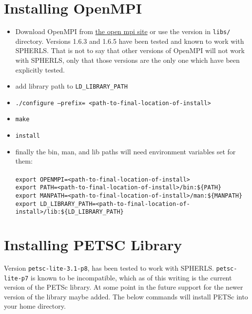 \documentclass[12pt,a4paper]{book}
\begin{document}
\section{Installing OpenMPI}
\begin{itemize}
\item Download OpenMPI from \href{http://www.open-mpi.org/software/ompi/v1.6/}{the open mpi site} or use the version in {\tt libs/} directory. Versions 1.6.3 and 1.6.5 have been tested and known to work with SPHERLS. That is not to say that other versions of OpenMPI will not work with SPHERLS, only that those versions are the only one which have been explicitly tested.

\item add library path to {\tt LD\_LIBRARY\_PATH}
\item {\tt ./configure --prefix=\- <path-to-final-location-of-install>}
\item {\tt make}
\item {\tt install}
\item finally the bin, man, and lib paths will need environment variables set for them:\\
 \\

{\tt export OPENMPI\-=<path-to-final-location-of-install>}\\
{\tt export PATH\-=<path-to-final-location-of-install>/bin:\-\$\{PATH\}}\\
{\tt export MANPATH\-=<path-to-final-location-of-install>/man:\-\$\{MANPATH\}}\\
{\tt export LD\_LIBRARY\_PATH\-=<path-to-final-location-of-install>/lib\-:\$\{LD\_LIBRARY\_PATH\}}\\

\end{itemize}

\section{Installing PETSC Library}
Version {\tt petsc\--lite-3.1-p8}, has been tested to work with SPHERLS. {\tt petsc\--lite\--p7} is known to be incompatible, which as of this writing is the current version of the PETSc library. At some point in the future support for the newer version of the library maybe added. The below commands will install PETSc into your home directory.
\end{document}
